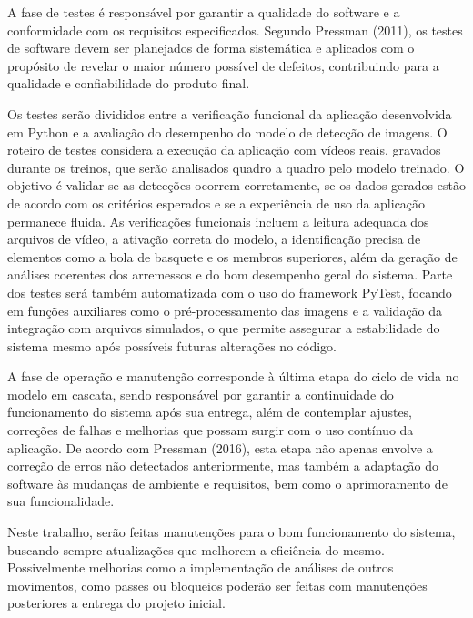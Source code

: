 \label{sssec:proj-sistema}

\label{sssec:implementação}

\label{sssec:testes}

A fase de testes é responsável por garantir a qualidade do software e a conformidade com os requisitos especificados. 
Segundo Pressman (2011), os testes de software devem ser planejados de forma sistemática e aplicados com o propósito de revelar o maior número possível de defeitos, contribuindo para a qualidade e confiabilidade do produto final.

Os testes serão divididos entre a verificação funcional da aplicação desenvolvida em Python e a avaliação do desempenho do modelo de detecção de imagens. 
O roteiro de testes considera a execução da aplicação com vídeos reais, gravados durante os treinos, que serão analisados quadro a quadro pelo modelo treinado. 
O objetivo é validar se as detecções ocorrem corretamente, se os dados gerados estão de acordo com os critérios esperados e se a experiência de uso da aplicação permanece fluida. 
As verificações funcionais incluem a leitura adequada dos arquivos de vídeo, a ativação correta do modelo, a identificação precisa de elementos como a bola de basquete e os membros superiores, 
além da geração de análises coerentes dos arremessos e do bom desempenho geral do sistema. Parte dos testes será também automatizada com o uso do framework PyTest, 
focando em funções auxiliares como o pré-processamento das imagens e a validação da integração com arquivos simulados, o que permite assegurar a estabilidade do sistema mesmo após possíveis futuras alterações no código.

\label{sssec:operação}

A fase de operação e manutenção corresponde à última etapa do ciclo de vida no modelo em cascata, sendo responsável por garantir a continuidade do funcionamento do sistema após sua entrega, 
além de contemplar ajustes, correções de falhas e melhorias que possam surgir com o uso contínuo da aplicação. De acordo com Pressman (2016), esta etapa não apenas envolve a correção de erros não detectados anteriormente, 
mas também a adaptação do software às mudanças de ambiente e requisitos, bem como o aprimoramento de sua funcionalidade.

Neste trabalho, serão feitas manutenções para o bom funcionamento do sistema, buscando sempre atualizações que melhorem a eficiência do mesmo. 
Possivelmente melhorias como a implementação de análises de outros movimentos, como passes ou bloqueios poderão ser feitas com manutenções posteriores a entrega do projeto inicial.

